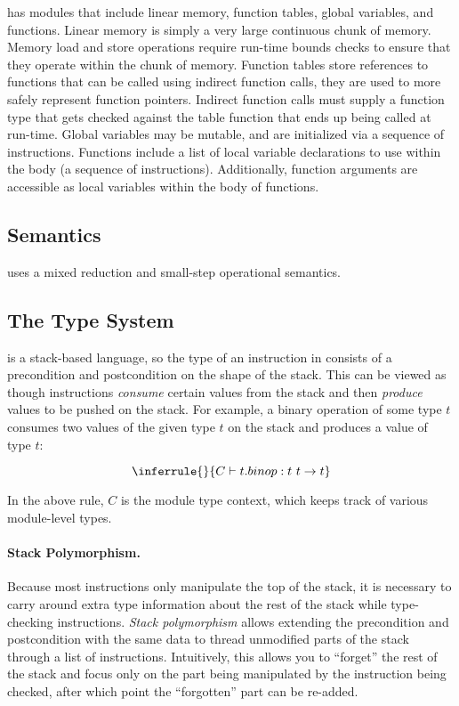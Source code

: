 \wasm has modules that include linear memory, function tables, global variables, and functions.
Linear memory is simply a very large continuous chunk of memory.
Memory load and store operations require run-time bounds checks to ensure that they operate within the chunk of memory.
Function tables store references to functions that can be called using indirect function calls, they are used to more safely represent function pointers.
Indirect function calls must supply a function type that gets checked against the table function that ends up being called at run-time.
Global variables may be mutable, and are initialized via a sequence of instructions.
Functions include a list of local variable declarations to use within the body (a sequence of instructions).
Additionally, function arguments are accessible as local variables within the body of functions.

\subsection{\wasm Semantics}
\label{subsec:wasmsemantics}
\wasm uses a mixed reduction and small-step operational semantics.




\subsection{The \wasm Type System}
\wasm is a stack-based language, so the type of an instruction in \wasm consists of a precondition and postcondition on the shape of the stack.
This can be viewed as though instructions \emph{consume} certain values from the stack and then \emph{produce} values to be pushed on the stack.
For example, a binary operation of some type $t$ consumes two values of the given type $t$ on the stack and produces a value of type $t$:

\[
    \inferrule{ }{C \vdash t.binop : t\ t \rightarrow t}
\]

In the above rule, $C$ is the module type context, which keeps track of various module-level types.


\paragraph{Stack Polymorphism.}
Because most instructions only manipulate the top of the stack, it is necessary to carry around extra type information about the rest of the stack while type-checking instructions.
\emph{Stack polymorphism} allows extending the precondition and postcondition with the same data to thread unmodified parts of the stack through a list of instructions.
Intuitively, this allows you to ``forget'' the rest of the stack and focus only on the part being manipulated by the instruction being checked, after which point the ``forgotten'' part can be re-added.

